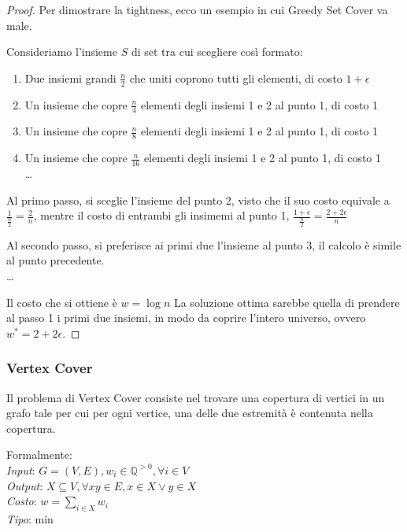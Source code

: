 \begin{proof}
    Per dimostrare la tightness, ecco un esempio in cui Greedy Set Cover va male.

    Consideriamo l'insieme $S$ di set tra cui scegliere così formato:
    \begin{enumerate}
        \item Due insiemi grandi $\frac{n}{2}$ che uniti coprono tutti gli elementi, 
        di costo $1+\epsilon$
        \item Un insieme che copre $\frac{n}{4}$ elementi degli insiemi 1 e 2 al punto 1, di costo 1
        \item Un insieme che copre $\frac{n}{8}$ elementi degli insiemi 1 e 2 al punto 1, di costo 1
        \item Un insieme che copre $\frac{n}{16}$ elementi degli insiemi 1 e 2 al punto 1, di costo 1\\
        \dots
    \end{enumerate}
    Al primo passo, si sceglie l'insieme del punto 2, visto che
    il suo costo equivale a $\frac{1}{\frac{n}{2}} = \frac{2}{n}$, mentre il costo 
    di entrambi gli insimemi al punto 1, $\frac{1+\epsilon}{\frac{n}{2}} = \frac{2+2\epsilon}{n}$

    Al secondo passo, si preferisce ai primi due l'insieme al punto 3, il calcolo è simile al punto precedente.\\
    \dots

    Il costo che si ottiene è $w = \log n$
    La soluzione ottima sarebbe quella di prendere al passo 1 i primi due insiemi, in modo da coprire l'intero 
    universo, ovvero $w^* = 2 + 2\epsilon$.
\end{proof}

\subsubsection{Vertex Cover}
Il problema di Vertex Cover consiste nel trovare una copertura di 
vertici in un grafo tale per cui per ogni vertice, una delle due estremità è contenuta nella copertura.

Formalmente: \\
\emph{Input}: $G=(V,E), w_i \in \mathbb{Q}^{>0}, \forall i \in V$\\
\emph{Output}: $X \subseteq V, \forall xy \in E, x \in X \vee y \in X$\\
\emph{Costo}: $w = \sum_{i \in X} w_i$\\
\emph{Tipo}: min\\

